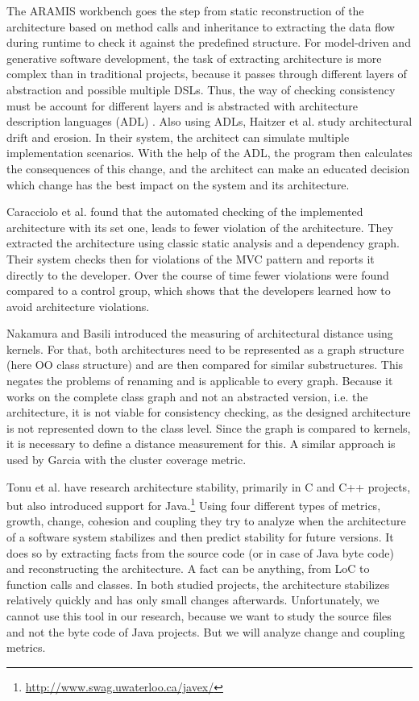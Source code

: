 \documentclass[conference]{IEEEtran}
\begin{document}
The ARAMIS workbench \cite{Aramis} goes the step from static reconstruction of the architecture based on method calls and inheritance to extracting the data flow during runtime to check it against the predefined structure. 
For model-driven and generative software development, the task of extracting architecture is more complex than in traditional projects, because it passes through different layers of abstraction and possible multiple DSLs. 
Thus, the way of checking consistency must be account for different layers and is abstracted with architecture description languages (ADL) \cite{ArcCons,Arc-MDSE}. 
Also using ADLs, Haitzer et al. \cite{Arc-Decision} study architectural drift and erosion. In their system, the architect can simulate multiple implementation scenarios. With the help of the ADL, the program then calculates the consequences of this change, and the architect can make an educated decision which change has the best impact on the system and its architecture. 

Caracciolo et al. \cite{ArcConf} found that the automated checking of the implemented architecture with its set one, leads to fewer violation of the architecture. They extracted the architecture using classic static analysis and a dependency graph. Their system checks then for violations of the MVC pattern and reports it directly to the developer. Over the course of time fewer violations were found compared to a control group, which shows that the developers learned how to avoid architecture violations.

Nakamura and Basili \cite{StructDist} introduced the measuring of architectural distance using kernels. For that, both architectures need to be represented as a graph structure (here OO class structure) and are then compared for similar substructures. This negates the problems of renaming and is applicable to every graph. 
Because it works on the complete class graph and not an abstracted version, i.e. the architecture, it is not viable for consistency checking, as the designed architecture is not represented down to the class level. 
Since the graph is compared to kernels, it is necessary to define a distance measurement for this. A similar approach is used by Garcia \cite{arcade-thesis} with the cluster coverage metric.

Tonu et al. \cite{Swag} have research architecture stability, primarily in C and C++ projects, but also introduced support for Java.\footnote{\url{http://www.swag.uwaterloo.ca/javex/}} Using four different types of metrics, growth, change, cohesion and coupling they try to analyze when the architecture of a software system stabilizes and then predict stability for future versions. It does so by extracting facts from the source code (or in case of Java byte code) and reconstructing the architecture. A fact can be anything, from LoC to function calls and classes. 
In both studied projects, the architecture stabilizes relatively quickly and has only small changes afterwards. Unfortunately, we cannot use this tool in our research, because we want to study the source files and not the byte code of Java projects. But we will analyze change and coupling metrics.
\end{document}
